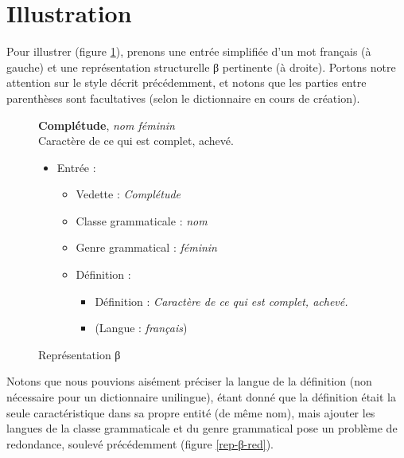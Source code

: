 \documentclass[10pt]{report}
\newcommand{\entité}[1]{\textcolor{blue!60!black}{#1}}
\newcommand{\caractéristique}[1]{\textcolor{green!60!black}{#1}}
\newcommand{\entitétechnique}[1]{\textcolor{blue!50!red}{#1}}
\begin{document}
\section{Illustration}

Pour illustrer (figure \ref{rep-β}), prenons une entrée simplifiée d’un mot français (à gauche) et une représentation structurelle β pertinente (à droite). Portons notre attention sur le style décrit précédemment, et notons que les parties entre parenthèses sont facultatives (selon le dictionnaire en cours de création).

\begin{figure}[H]
	\centering
	\begin{minipage}{0.3\linewidth}
    \textbf{Complétude}, \textit{nom féminin}\\    
    Caractère de ce qui est complet, achevé.
	\end{minipage}%
	\begin{minipage}{0.5\linewidth}
    \begin{itemize}
    	\item \entité{Entrée} :
    	\begin{itemize}
        \item \caractéristique{Vedette} : \textit{Complétude}
        \item \caractéristique{Classe grammaticale} : \textit{nom}
        \item \caractéristique{Genre grammatical} : \textit{féminin}
        \item \entité{Définition} :
        \begin{itemize}
        	\item \caractéristique{Définition} : \textit{Caractère de ce qui est complet, achevé.}
        	\item (\caractéristique{Langue} : \textit{français})
        \end{itemize}
    	\end{itemize}
    \end{itemize}
	\end{minipage}
	\caption{Représentation β}
	\label{rep-β}
\end{figure}

Notons que nous pouvions aisément préciser la \caractéristique{langue} de la \caractéristique{définition} (non nécessaire pour un dictionnaire unilingue), étant donné que la \caractéristique{définition} était la seule caractéristique dans sa propre entité (de même nom), mais ajouter les \caractéristique{langues} de la \caractéristique{classe grammaticale} et du \caractéristique{genre grammatical} pose un problème de redondance, soulevé précédemment (figure \ref{rep-β-red}).
\end{document}
